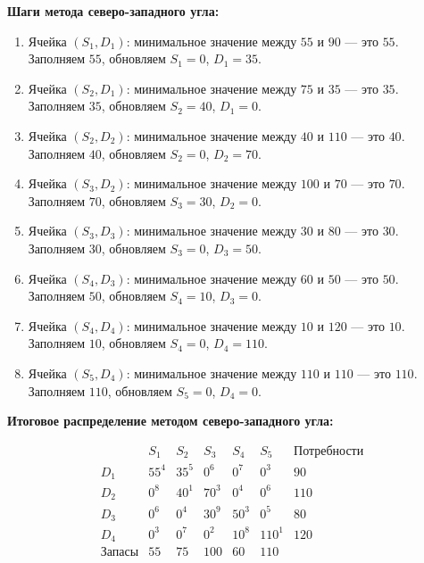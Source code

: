 \documentclass{article}
\begin{document}
\textbf{Шаги метода северо-западного угла:}

\begin{enumerate}
    \item Ячейка \((S_1, D_1)\): минимальное значение между \(55\) и \(90\) — это \(55\). Заполняем \(55\), обновляем \(S_1 = 0\), \(D_1 = 35\).
    \item Ячейка \((S_2, D_1)\): минимальное значение между \(75\) и \(35\) — это \(35\). Заполняем \(35\), обновляем \(S_2 = 40\), \(D_1 = 0\).
    \item Ячейка \((S_2, D_2)\): минимальное значение между \(40\) и \(110\) — это \(40\). Заполняем \(40\), обновляем \(S_2 = 0\), \(D_2 = 70\).
    \item Ячейка \((S_3, D_2)\): минимальное значение между \(100\) и \(70\) — это \(70\). Заполняем \(70\), обновляем \(S_3 = 30\), \(D_2 = 0\).
    \item Ячейка \((S_3, D_3)\): минимальное значение между \(30\) и \(80\) — это \(30\). Заполняем \(30\), обновляем \(S_3 = 0\), \(D_3 = 50\).
    \item Ячейка \((S_4, D_3)\): минимальное значение между \(60\) и \(50\) — это \(50\). Заполняем \(50\), обновляем \(S_4 = 10\), \(D_3 = 0\).
    \item Ячейка \((S_4, D_4)\): минимальное значение между \(10\) и \(120\) — это \(10\). Заполняем \(10\), обновляем \(S_4 = 0\), \(D_4 = 110\).
    \item Ячейка \((S_5, D_4)\): минимальное значение между \(110\) и \(110\) — это \(110\). Заполняем \(110\), обновляем \(S_5 = 0\), \(D_4 = 0\).
\end{enumerate}

\textbf{Итоговое распределение методом северо-западного угла:}

\[
    \begin{array}{c|ccccc|c}
                      & S_1  & S_2  & S_3  & S_4  & S_5   & \text{Потребности} \\
        \hline
        D_1           & 55^4 & 35^5 & 0^6  & 0^7  & 0^3   & 90                 \\
        D_2           & 0^8  & 40^1 & 70^3 & 0^4  & 0^6   & 110                \\
        D_3           & 0^6  & 0^4  & 30^9 & 50^3 & 0^5   & 80                 \\
        D_4           & 0^3  & 0^7  & 0^2  & 10^8 & 110^1 & 120                \\
        \hline
        \text{Запасы} & 55   & 75   & 100  & 60   & 110   &                    \\
    \end{array}
\]
\end{document}
